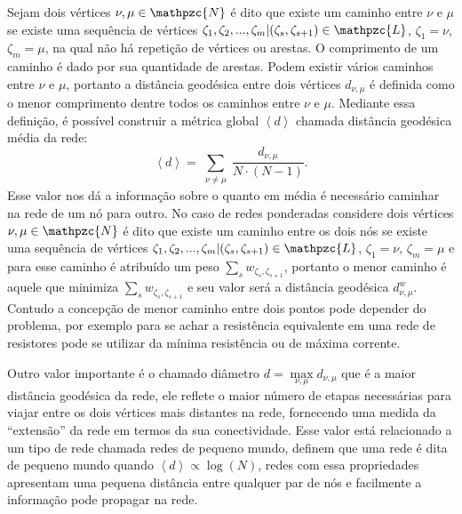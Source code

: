 Sejam dois vértices $\nu,\mu \in \mathpzc{N}$ é dito que existe um caminho entre $\nu$ e $\mu$ se existe uma sequência de vértices $\zeta_1,\zeta_{2},...,\zeta_m | (\zeta_{s},\zeta_{s+1}) \in \mathpzc{L}$, $\zeta_1=\nu$, $\zeta_m=\mu$, na qual não há repetição de vértices ou arestas. O comprimento de um caminho é dado por sua quantidade de arestas. 
Podem existir vários caminhos 
entre $\nu$ e $\mu$, portanto a distância geodésica entre dois vértices $d_{\nu,\mu}$ é definida como o menor comprimento dentre todos os caminhos entre $\nu$ e $\mu$. Mediante essa definição, é possível construir a métrica 
global $\left\langle d \right\rangle $
chamada distância geodésica média da rede:
\begin{equation}
     \left\langle d \right\rangle  = \sum_{\substack{\nu\neq\mu}} \frac{d_{\nu,\mu}}{N\cdot(N-1)}.
\end{equation}
Esse valor nos dá a informação sobre o quanto em média é necessário caminhar na rede de um nó para outro. No caso de redes ponderadas considere dois vértices $\nu,\mu \in \mathpzc{N}$ é dito que existe um caminho entre os dois nós se existe uma sequência de vértices $\zeta_1,\zeta_{2},...,\zeta_m | (\zeta_{s},\zeta_{s+1}) \in \mathpzc{L}$, $\zeta_1=\nu$, $\zeta_m=\mu$ e para esse caminho é atribuído um peso $\sum_{s}w_{\zeta_s,\zeta_{s+1}}$, portanto o menor caminho é aquele que minimiza 
$\sum_{s}w_{\zeta_s,\zeta_{s+1}}$ e seu valor será a distância geodésica $d_{\nu,\mu}^w$. Contudo a concepção de menor caminho entre dois pontos pode depender do problema, por exemplo para se achar a resistência equivalente em uma rede de resistores pode se utilizar da mínima resistência ou de máxima corrente.

Outro valor importante é o chamado diâmetro $d = \max\limits_{\nu,\mu} d_{\nu,\mu}$ que é a maior distância geodésica da rede, ele reflete o maior número de etapas necessárias para viajar entre os dois vértices mais distantes na rede, fornecendo uma medida da ``extensão'' da rede em termos da sua conectividade. 
Esse valor está relacionado a um tipo de rede chamada redes de pequeno mundo,  definem que uma rede é dita de pequeno mundo quando $\left\langle d\right\rangle \propto \log(N)$, redes com essa propriedades apresentam uma pequena distância entre qualquer par de nós e facilmente a informação pode propagar na rede.

